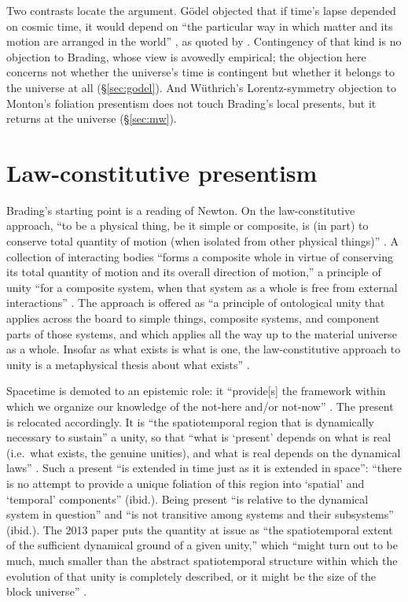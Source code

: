 \documentclass[11pt]{article}
\begin{document}
Two contrasts locate the argument. Gödel objected that if time's lapse
depended on cosmic time, it would depend on ``the particular way in which
matter and its motion are arranged in the world'' \citep[p.~562]{Godel1949}, as quoted by \citet[sec.~6]{Monton2006}. Contingency of that kind is no objection
to Brading, whose view is avowedly empirical; the objection here concerns not
whether the universe's time is contingent but whether it belongs to the
universe at all (\S\ref{sec:godel}). And Wüthrich's Lorentz-symmetry objection
to Monton's foliation presentism does not touch Brading's local presents, but
it returns at the universe (\S\ref{sec:mw}).

\section{Law-constitutive presentism}\label{sec:view}

Brading's starting point is a reading of Newton. On the law-constitutive
approach, ``to be a physical thing, be it simple or composite, is (in part) to
conserve total quantity of motion (when isolated from other physical
things)'' \citep[p.~1105]{Brading2013}. A collection of interacting bodies
``forms a composite whole in virtue of conserving its total quantity of
motion and its overall direction of motion,'' a principle of unity ``for a
composite system, when that system as a whole is free from external
interactions'' \citep[p.~16]{Brading2015}. The approach is offered as ``a
principle of ontological unity that applies across the board to simple
things, composite systems, and component parts of those systems, and which
applies all the way up to the material universe as a whole. Insofar as what
exists is what is one, the law-constitutive approach to unity is a
metaphysical thesis about what exists'' \citep[p.~16]{Brading2015}.

Spacetime is demoted to an epistemic role: it ``provide[s] the framework
within which we organize our knowledge of the not-here and/or not-now''
\citep[p.~17]{Brading2015}. The present is relocated accordingly. It is
``the spatiotemporal region that is dynamically necessary to sustain'' a
unity, so that ``what is `present' depends on what is real (i.e.\ what exists,
the genuine unities), and what is real depends on the dynamical laws''
\citep[p.~17]{Brading2015}. Such a present ``is extended in time just as it is
extended in space'': ``there is no attempt to provide a unique foliation of
this region into `spatial' and `temporal' components'' (ibid.). Being present
``is relative to the dynamical system in question'' and ``is not transitive
among systems and their subsystems'' (ibid.). The 2013 paper puts the
quantity at issue as ``the spatiotemporal extent of the sufficient dynamical
ground of a given unity,'' which ``might turn out to be much, much smaller than
the abstract spatiotemporal structure within which the evolution of that
unity is completely described, or it might be the size of the block
universe'' \citep[p.~1109]{Brading2013}.
\end{document}
